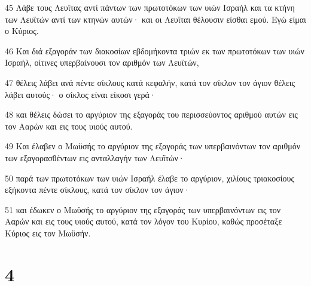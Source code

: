 \par 45 Λάβε τους Λευΐτας αντί πάντων των πρωτοτόκων των υιών Ισραήλ και τα κτήνη των Λευϊτών αντί των κτηνών αυτών· και οι Λευΐται θέλουσιν είσθαι εμού. Εγώ είμαι ο Κύριος.
\par 46 Και διά εξαγοράν των διακοσίων εβδομήκοντα τριών εκ των πρωτοτόκων των υιών Ισραήλ, οίτινες υπερβαίνουσι τον αριθμόν των Λευϊτών,
\par 47 θέλεις λάβει ανά πέντε σίκλους κατά κεφαλήν, κατά τον σίκλον τον άγιον θέλεις λάβει αυτούς· ο σίκλος είναι είκοσι γερά·
\par 48 και θέλεις δώσει το αργύριον της εξαγοράς του περισσεύοντος αριθμού αυτών εις τον Ααρών και εις τους υιούς αυτού.
\par 49 Και έλαβεν ο Μωϋσής το αργύριον της εξαγοράς των υπερβαινόντων τον αριθμόν των εξαγορασθέντων εις ανταλλαγήν των Λευϊτών·
\par 50 παρά των πρωτοτόκων των υιών Ισραήλ έλαβε το αργύριον, χιλίους τριακοσίους εξήκοντα πέντε σίκλους, κατά τον σίκλον τον άγιον·
\par 51 και έδωκεν ο Μωϋσής το αργύριον της εξαγοράς των υπερβαινόντων εις τον Ααρών και εις τους υιούς αυτού, κατά τον λόγον του Κυρίου, καθώς προσέταξε Κύριος εις τον Μωϋσήν.

\chapter{4}

